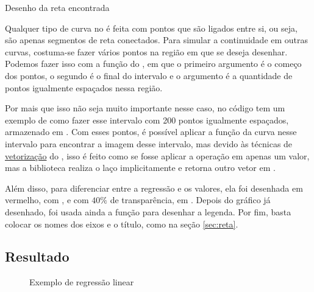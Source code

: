     \begin{listing}[H]
        \caption{Desenho da reta encontrada}
        \label{code:regres:plot}

    \end{listing}

    Qualquer tipo de curva no \matplotlib é feita com pontos que são ligados entre si, ou seja, são apenas segmentos de reta conectados. Para simular a continuidade em outras curvas, costuma-se fazer vários pontos na região em que se deseja desenhar. Podemos fazer isso com a função  do \numpy, em que o primeiro argumento é o começo dos pontos, o segundo é o final do intervalo e o argumento  é a quantidade de pontos igualmente espaçados nessa região.

    Por mais que isso não seja muito importante nesse caso, no código tem um exemplo de como fazer esse intervalo com 200 pontos igualmente espaçados, armazenado em . Com esses pontos, é possível aplicar a função da curva nesse intervalo para encontrar a imagem desse intervalo, mas devido às técnicas de \href{https://realpython.com/numpy-array-programming/\#what-is-vectorization}{vetorização} do \numpy, isso é feito como se fosse aplicar a operação em apenas um valor, mas a biblioteca realiza o laço implicitamente e retorna outro vetor em .

    Além disso, para diferenciar entre a regressão e os valores, ela foi desenhada em vermelho, com , e com $40\%$ de transparência, em . Depois do gráfico já desenhado, foi usada ainda a função  para desenhar a legenda. Por fim, basta colocar os nomes dos eixos e o título, como na seção \ref{sec:reta}.


\subsection{Resultado}

    \begin{figure}[H]
        \centering
        

        \caption{Exemplo de regressão linear}
        \label{fig:regres:resultado}
    \end{figure}
